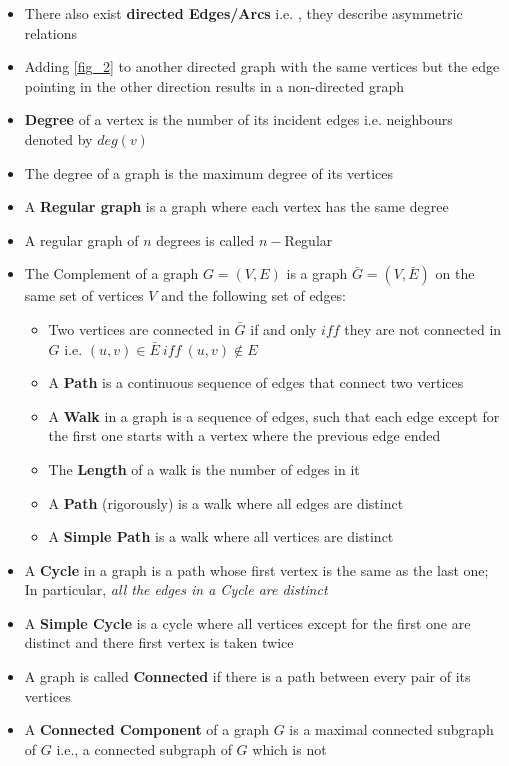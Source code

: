 \begin{itemize}
\item There also exist \textbf{directed Edges/Arcs} i.e. , they describe asymmetric relations
\item Adding \ref{fig_2} to another directed graph with the same vertices but the edge pointing in the other direction results in a non-directed graph
\item \textbf{Degree} of a vertex is the number of its incident edges i.e. neighbours denoted by $deg(v)$
\item The degree of a graph is the maximum degree of its vertices
\item A \textbf{Regular graph} is a graph where each vertex has the same degree
\item A regular graph of $n$ degrees is called $n-$Regular
\item  The Complement of a graph $G = (V, E)$ is a graph $\bar{G} = (V, \bar{E})$ on the same set of vertices $V$ and the following set of edges:
\begin{itemize}
\item Two vertices are connected in $\bar{G}$ if and only $iff$ they are not connected in $G$ i.e. $(u,v) \in \bar{E} \ iff \  (u,v) \notin E$
\item A \textbf{Path} is a continuous sequence of edges that connect two vertices
\item A \textbf{Walk} in a graph is a sequence of edges, such that each edge except for the first one starts with a vertex where the previous edge ended
\item The \textbf{Length} of a walk is the number of edges in it
\item A \textbf{Path} (rigorously) is a walk where all edges are distinct
\item A \textbf{Simple Path} is a walk where all vertices are distinct
\end{itemize}
\item  A \textbf{Cycle} in a graph is a path whose first vertex is the same as the last one; In particular, \textit{all the edges in a Cycle are
	distinct}
\item A \textbf{Simple Cycle} is a cycle where all vertices
except for the first one are distinct and
there first vertex is taken twice
\item A graph is called \textbf{Connected} if there is a path
between every pair of its vertices
\item  A \textbf{Connected Component} of a graph $G$ is a
maximal connected subgraph of $G$ i.e., a connected subgraph of $G$ which is not

\end{itemize}

